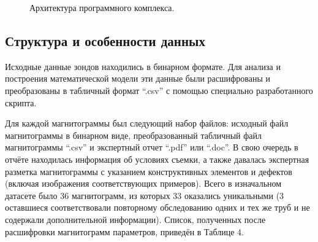 \documentclass[a4paper,article,14pt]{extarticle}
\begin{document}
\begin{figure}[ht]
    \begin{center}
    
    \caption{
    \label{image3}
    Архитектура программного комплекса.}
    \end {center}
\end {figure}

\subsection{Структура и особенности данных}

Исходные данные зондов находились в бинарном формате. 
Для анализа и построения математической модели 
эти данные были расшифрованы и преобразованы в табличный формат “.csv” 
с помощью специально разработанного скрипта. 

Для каждой магнитограммы был следующий набор файлов: 
исходный файл магнитограммы в бинарном виде, преобразованный 
табличный файл магнитограммы “.csv” и экспертный отчет “.pdf” или “.doc”. 
В свою очередь в отчёте находилась информация об условиях съемки, 
а также давалась экспертная разметка магнитограммы с указанием конструктивных
элементов и дефектов (включая изображения соответствующих примеров). 
Всего в изначальном датасете было 36 магнитограмм, из которых 33 оказались 
уникальными (3 оставшиеся соответствовали повторному обследованию одних и 
тех же труб и не содержали дополнительной информации). Список, полученных после 
расшифровки магнитограмм параметров, приведён в Таблице 4. 
\end{document}
